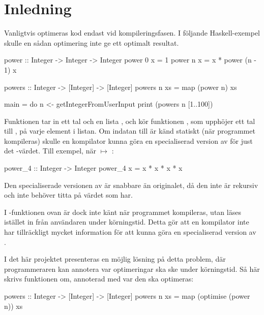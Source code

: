 \documentclass[Rapport]{subfiles}
\begin{document}
\section{Inledning}

Vanligtvis optimeras kod endast vid kompileringsfasen. I följande Haskell-exempel 
skulle en sådan optimering inte ge ett optimalt resultat.

\begin{codeEx}
power :: Integer -> Integer -> Integer
power 0 x = 1
power n x = x * power (n - 1) x

powers :: Integer -> [Integer] -> [Integer]
powers n xs = map (power n) xs

main = do
    n <- getIntegerFromUserInput
    print (powers n [1..100])

\end{codeEx}

Funktionen  tar in ett tal  och en lista , och kör funktionen , 
som upphöjer ett tal till , på varje element i listan. Om indatan  till 
 är känd statiskt (när programmet kompileras) skulle en kompilator kunna 
göra en specialiserad version av  för just det -värdet. Till exempel, när  $\mapsto$ :

\begin{codeEx}
power_4 :: Integer -> Integer
power_4 x = x * x * x * x
\end{codeEx}

Den specialiserade versionen av  är snabbare än originalet, då den inte är 
rekursiv och inte behöver titta på värdet som  har.

I -funktionen ovan är dock  inte känt när programmet kompileras, utan läses 
istället in från användaren under körningstid. Detta gör att en kompilator inte 
har tillräckligt mycket information för att kunna göra en specialiserad version av .

I det här projektet presenteras en möjlig lösning på detta problem,
där programmeraren kan annotera var optimeringar ska ske under körningstid.
Så här skrivs funktionen  om,
annoterad med var den ska optimeras:

\begin{codeEx}
powers :: Integer -> [Integer] -> [Integer]
powers n xs = map (optimise (power n)) xs
\end{codeEx}
\end{document}
